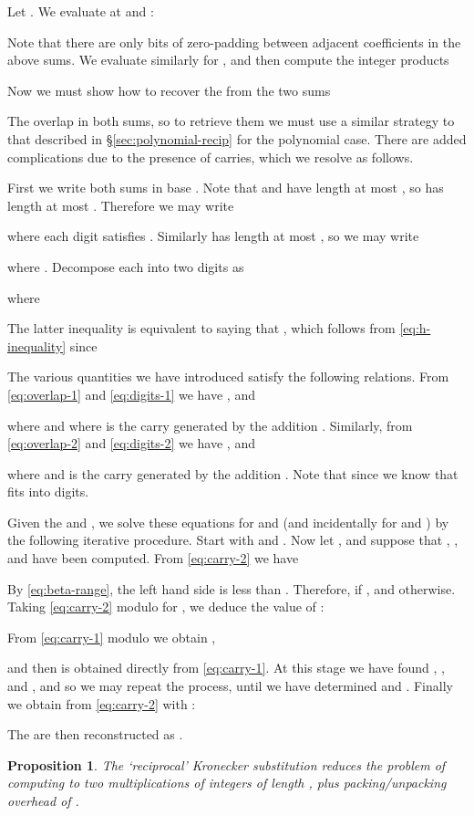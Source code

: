 \documentclass{amsart}
\newtheorem{prop}[thm]{Proposition}
\theoremstyle{definition}
\theoremstyle{remark}
\begin{document}
Let . We evaluate at  and :

Note that there are only  bits of zero-padding between adjacent coefficients in the above sums. We evaluate similarly for , and then compute the integer products


Now we must show how to recover the  from the two sums

The  overlap in both sums, so to retrieve them we must use a similar strategy to that described in \S\ref{sec:polynomial-recip} for the polynomial case. There are added complications due to the presence of carries, which we resolve as follows.

First we write both sums in base . Note that  and  have length at most , so  has length at most . Therefore we may write

where each digit  satisfies . Similarly  has length at most , so we may write

where . Decompose each  into two digits as
 
where

The latter inequality is equivalent to saying that , which follows from \eqref{eq:h-inequality} since


The various quantities we have introduced satisfy the following relations. From \eqref{eq:overlap-1} and \eqref{eq:digits-1} we have , and

where  and where  is the carry generated by the addition . Similarly, from \eqref{eq:overlap-2} and \eqref{eq:digits-2} we have , and

where  and  is the carry generated by the addition . Note that  since we know that  fits into  digits.

Given the  and , we solve these equations for  and  (and incidentally for  and ) by the following iterative procedure. Start with  and . Now let , and suppose that , ,  and  have been computed. From \eqref{eq:carry-2} we have
 
By \eqref{eq:beta-range}, the left hand side is less than . Therefore,  if , and  otherwise. Taking \eqref{eq:carry-2} modulo  for , we deduce the value of :
 
From \eqref{eq:carry-1} modulo  we obtain ,
 
and then  is obtained directly from \eqref{eq:carry-1}. At this stage we have found , ,  and , and so we may repeat the process, until we have determined  and . Finally we obtain  from \eqref{eq:carry-2} with :
 
The  are then reconstructed as .

\begin{prop}
\label{prop:integer-recip-ks}
The `reciprocal' Kronecker substitution reduces the problem of computing  to two multiplications of integers of length , plus packing/unpacking overhead of .
\end{prop}
\end{document}
